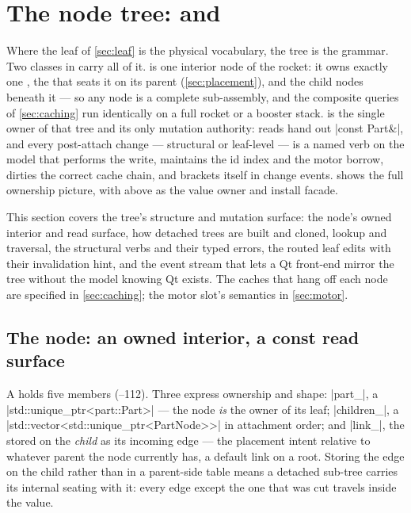 \section[The node tree: PartNode and PartsModel]{The node tree:  and
}\label{sec:tree}

Where the leaf of \cref{sec:leaf} is the physical vocabulary, the tree is the grammar. Two classes
in  carry all of it.  is one interior node of the
rocket: it owns exactly one , the  that seats it on its parent
(\cref{sec:placement}), and the child nodes beneath it --- so any node is a complete sub-assembly,
and the composite queries of \cref{sec:caching} run identically on a full rocket or a booster
stack.  is the single owner of that tree and its only mutation authority: reads
hand out \cppinline|const Part&|, and every post-attach change --- structural or leaf-level --- is
a named verb on the model that performs the write, maintains the id index and the motor borrow,
dirties the correct cache chain, and brackets itself in change events.  shows
the full ownership picture, with  above as the value owner and install facade.

This section covers the tree's structure and mutation surface: the node's owned interior and read
surface, how detached trees are built and cloned, lookup and traversal, the structural verbs and
their typed errors, the routed leaf edits with their invalidation hint, and the event stream that
lets a Qt front-end mirror the tree without the model knowing Qt exists. The caches that hang off
each node are specified in \cref{sec:caching}; the motor slot's semantics in \cref{sec:motor}.


\subsection{The node: an owned interior, a const read surface}\label{sec:tree-node}

A  holds five members (--112). Three express
ownership and shape: \cppinline|part_|, a \cppinline|std::unique_ptr<part::Part>| --- the node
\emph{is} the owner of its leaf; \cppinline|children_|, a
\cppinline|std::vector<std::unique_ptr<PartNode>>| in attachment order; and \cppinline|link_|, the
 stored on the \emph{child} as its incoming edge --- the placement intent
relative to whatever parent the node currently has, a default link on a root. Storing the edge on
the child rather than in a parent-side table means a detached sub-tree carries its internal
seating with it: every edge except the one that was cut travels inside the value.

